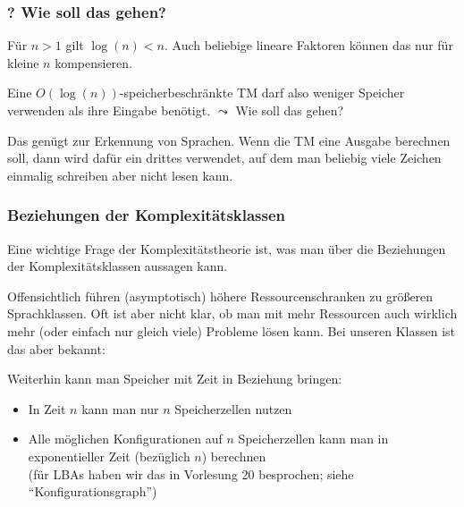 \documentclass[onlymath]{beamer}
\begin{document}
\begin{frame}\frametitle{? Wie soll das gehen?}

Für $n>1$ gilt \alert{$\log(n)<n$}. Auch beliebige lineare Faktoren können das nur für kleine $n$ kompensieren.\\
\medskip

Eine $O(\log(n))$-speicherbeschränkte TM darf also weniger Speicher verwenden als ihre Eingabe benötigt.
\alert{$\leadsto$ Wie soll das gehen?}
\bigskip\pause


{\footnotesize
Das genügt zur Erkennung von Sprachen. Wenn die TM eine Ausgabe berechnen soll, dann wird dafür ein 
drittes  verwendet, auf dem man beliebig viele Zeichen einmalig schreiben aber nicht lesen kann.\\
}

\end{frame}

\begin{frame}\frametitle{Beziehungen der Komplexitätsklassen}

\alert{Eine wichtige Frage der Komplexitätstheorie ist, was man über die Beziehungen der
Komplexitätsklassen aussagen kann.}
\medskip\pause

Offensichtlich führen (asymptotisch) höhere Ressourcenschranken zu größeren Sprachklassen.
Oft ist aber nicht klar, ob man mit mehr Ressourcen auch wirklich mehr (oder einfach nur gleich viele) Probleme lösen kann. Bei
unseren Klassen ist das aber bekannt:\medskip

\medskip\pause

Weiterhin kann man Speicher mit Zeit in Beziehung bringen:
\begin{itemize}
\item In Zeit $n$ kann man nur $n$ Speicherzellen nutzen
\item Alle möglichen Konfigurationen auf $n$ Speicherzellen kann man in exponentieller Zeit (bezüglich $n$) berechnen\\[-1ex]
{\tiny (für LBAs haben wir das in Vorlesung 20 besprochen; siehe "`Konfigurationsgraph"')}
\end{itemize}


\end{frame}
\end{document}
